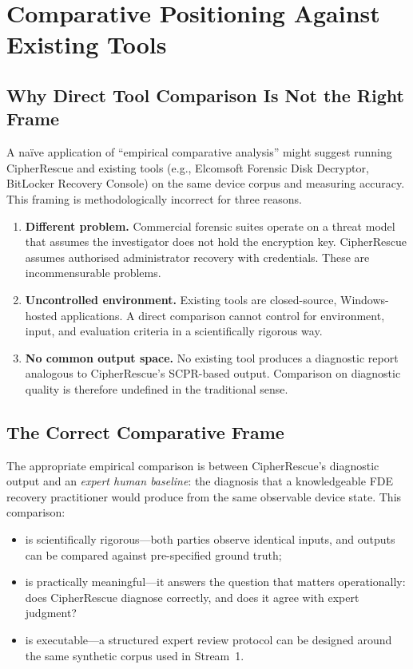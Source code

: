 \documentclass[11pt,a4paper]{report}
\begin{document}
\section{Comparative Positioning Against Existing Tools}
\label{sec:empirical:toolcomp}

\subsection{Why Direct Tool Comparison Is Not the Right Frame}

A na\"ive application of ``empirical comparative analysis'' might suggest running
CipherRescue and existing tools (e.g., Elcomsoft Forensic Disk Decryptor, BitLocker
Recovery Console) on the same device corpus and measuring accuracy. This framing is
methodologically incorrect for three reasons.

\begin{enumerate}
  \item \textbf{Different problem.} Commercial forensic suites operate on a threat model
    that assumes the investigator does not hold the encryption key. CipherRescue assumes
    authorised administrator recovery with credentials. These are incommensurable problems.
  \item \textbf{Uncontrolled environment.} Existing tools are closed-source,
    Windows-hosted applications. A direct comparison cannot control for environment, input,
    and evaluation criteria in a scientifically rigorous way.
  \item \textbf{No common output space.} No existing tool produces a diagnostic report
    analogous to CipherRescue's SCPR-based output. Comparison on diagnostic quality is
    therefore undefined in the traditional sense.
\end{enumerate}

\subsection{The Correct Comparative Frame}

The appropriate empirical comparison is between CipherRescue's diagnostic output and an
\emph{expert human baseline}: the diagnosis that a knowledgeable FDE recovery practitioner
would produce from the same observable device state. This comparison:

\begin{itemize}
  \item is scientifically rigorous---both parties observe identical inputs, and outputs can
    be compared against pre-specified ground truth;
  \item is practically meaningful---it answers the question that matters operationally:
    does CipherRescue diagnose correctly, and does it agree with expert judgment?
  \item is executable---a structured expert review protocol can be designed around the same
    synthetic corpus used in Stream~1.
\end{itemize}
\end{document}
